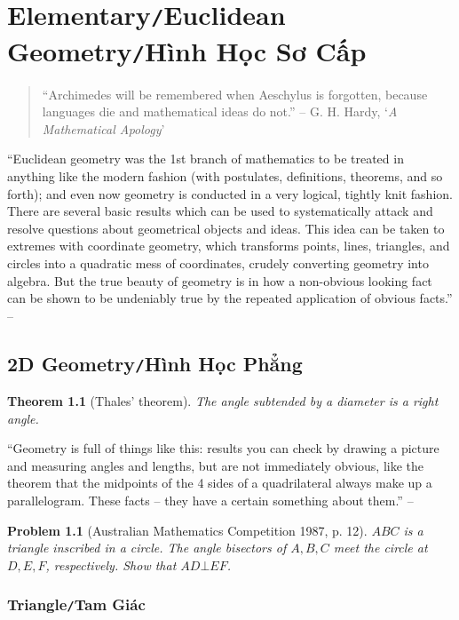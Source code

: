 \documentclass[oneside]{book}
\numberwithin{equation}{section}
\newtheorem{theorem}{Theorem}[section]
\newtheorem{problem}{Problem}[section]
\begin{document}

\chapter{Elementary\texttt{/}Euclidean Geometry\texttt{/}Hình Học Sơ Cấp}
\begin{quotation}
	``Archimedes will be remembered when Aeschylus is forgotten, because languages die and mathematical ideas do not.'' -- G. H. Hardy, `\textit{A Mathematical Apology}'
\end{quotation}
``Euclidean geometry was the 1st branch of mathematics to be treated in anything like the modern fashion (with postulates, definitions, theorems, and so forth); and even now geometry is conducted in a very logical, tightly knit fashion. There are several basic results which can be used to systematically attack and resolve questions about geometrical objects and ideas. This idea can be taken to extremes with coordinate geometry, which transforms points, lines, triangles, and circles into a quadratic mess of coordinates, crudely converting geometry into algebra. But the true beauty of geometry is in how a non-obvious looking fact can be shown to be undeniably true by the repeated application of obvious facts.'' -- \cite[Chap. 4, p. 49]{Tao2006}

\section{2D Geometry\texttt{/}Hình Học Phẳng}
\begin{theorem}[Thales' theorem]
	The angle subtended by a diameter is a right angle.
\end{theorem}
``Geometry is full of things like this: results you can check by drawing a picture and measuring angles and lengths, but are not immediately obvious, like the theorem that the midpoints of the 4 sides of a quadrilateral always make up a parallelogram. These facts -- they have a certain something about them.'' -- \cite[Chap. 4, p. 50]{Tao2006}

\begin{problem}[Australian Mathematics Competition 1987, p. 12]
	$ABC$ is a triangle inscribed in a circle. The angle bisectors of $A,B,C$ meet the circle at $D,E,F$, respectively. Show that $AD\bot EF$.
\end{problem}

\subsection{Triangle\texttt{/}Tam Giác}
\end{document}
